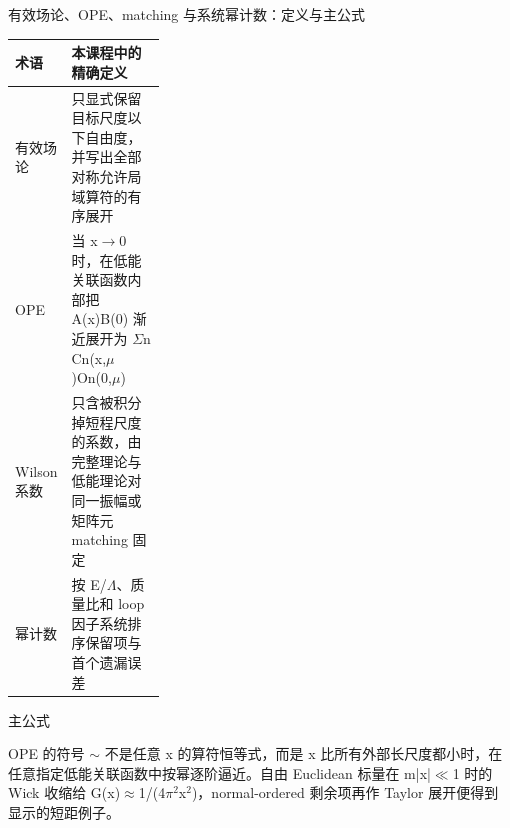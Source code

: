 \begin{frame}[t]{有效场论、OPE、matching 与系统幂计数：定义与主公式}
\footnotesize\begin{tabularx}{\linewidth}{p{0.30\linewidth}Y}
\toprule 术语 & 本课程中的精确定义\\\midrule
{} 有效场论 & 只显式保留目标尺度以下自由度，并写出全部对称允许局域算符的有序展开\\
 OPE & 当 x\ensuremath{\rightarrow}0 时，在低能关联函数内部把 A(x)B(0) 渐近展开为 \ensuremath{\Sigma}n Cn(x,\ensuremath{\mu})On(0,\ensuremath{\mu})\\
 Wilson 系数 & 只含被积分掉短程尺度的系数，由完整理论与低能理论对同一振幅或矩阵元 matching 固定\\
 幂计数 & 按 E/\allowbreak{}\ensuremath{\Lambda}、质量比和 loop 因子系统排序保留项与首个遗漏误差\\
\bottomrule\end{tabularx}\vspace{0.15cm}
\begin{block}{ 主公式}\centering{}\end{block}
OPE 的符号 \ensuremath{\sim} 不是任意 x 的算符恒等式，而是 x 比所有外部长尺度都小时，在任意指定低能关联函数中按幂逐阶逼近。自由 Euclidean 标量在 m|x|\ensuremath{\ll}1 时的 Wick 收缩给 G(x)\ensuremath{\approx}1/\allowbreak{}(4\ensuremath{\pi}\ensuremath{^{2}}x\ensuremath{^{2}})，normal-ordered 剩余项再作 Taylor 展开便得到显示的短距例子。
\end{frame}

